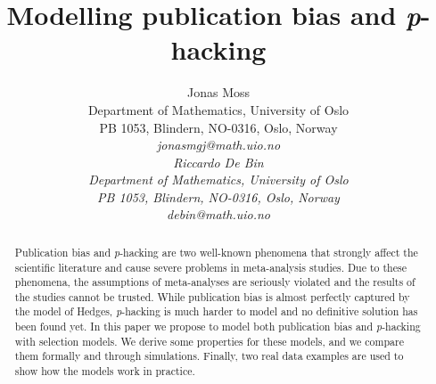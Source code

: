 \documentclass{article}
\title{Modelling publication bias and \textit{p}-hacking}
\author{
  Jonas Moss \\
  Department of Mathematics, University of Oslo\\
  PB 1053, Blindern, NO-0316, Oslo, Norway \\
  \it{jonasmgj@math.uio.no} \\ 
     \And
  Riccardo De Bin \\
  Department of Mathematics, University of Oslo\\
  PB 1053, Blindern, NO-0316, Oslo, Norway \\
  \it{debin@math.uio.no} \\ 
}
\theoremstyle{plain}
\theoremstyle{definition}
\begin{document}
\maketitle
\begin{abstract}
Publication bias and \textit{p}-hacking are two well-known phenomena that strongly affect the scientific literature and cause severe problems in meta-analysis studies. Due to these phenomena, the assumptions of meta-analyses are seriously violated and the results of the studies cannot be trusted. While publication bias is almost perfectly captured by the model of Hedges, \textit{p}-hacking is much harder to model and no definitive solution has been found yet. In this paper we propose to model both publication bias and \textit{p}-hacking with selection models. We derive some properties for these models, and we compare them formally and through simulations. Finally, two real data examples are used to show how the models work in practice.
\end{abstract}








\end{document}
